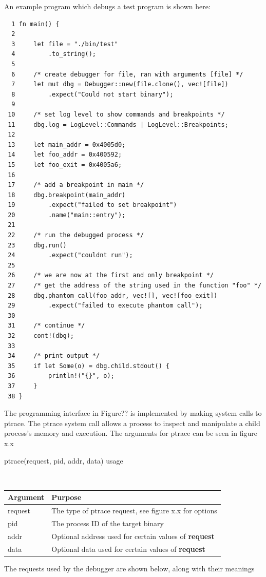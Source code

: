 \documentclass{article}
\begin{document}
An example program which debugs a test program is shown here:
\begin{verbatim}
  1 fn main() {
  2
  3     let file = "./bin/test"
  4         .to_string();
  5
  6     /* create debugger for file, ran with arguments [file] */
  7     let mut dbg = Debugger::new(file.clone(), vec![file])
  8         .expect("Could not start binary");
  9
 10     /* set log level to show commands and breakpoints */
 11     dbg.log = LogLevel::Commands | LogLevel::Breakpoints;
 12
 13     let main_addr = 0x4005d0;
 14     let foo_addr = 0x400592;
 15     let foo_exit = 0x4005a6;
 16
 17     /* add a breakpoint in main */
 18     dbg.breakpoint(main_addr)
 19         .expect("failed to set breakpoint")
 20         .name("main::entry");
 21
 22     /* run the debugged process */
 23     dbg.run()
 24         .expect("couldnt run");
 25
 26     /* we are now at the first and only breakpoint */
 27     /* get the address of the string used in the function "foo" */
 28     dbg.phantom_call(foo_addr, vec![], vec![foo_exit])
 29         .expect("failed to execute phantom call");
 30
 31     /* continue */
 32     cont!(dbg);
 33
 34     /* print output */
 35     if let Some(o) = dbg.child.stdout() {
 36         println!("{}", o);
 37     }
 38 }
\end{verbatim}

The programming interface in Figure?? is implemented by making system calls to ptrace. The ptrace system call allows a
process to inspect and manipulate a child process's memory and execution. The arguments for ptrace can be seen in figure
x.x

\begin{center}
    \caption{ptrace(request, pid, addr, data) usage} \\
    \begin{tabular}{|l|l|}
    \hline
    \bf Argument & \bf Purpose \\ \hline
    request & The type of ptrace request, see figure x.x for options \\ \hline
    pid & The process ID of the target binary \\ \hline
    addr & Optional address used for certain values of \bf{request} \\ \hline
    data & Optional data used for certain values of \bf{request} \\ \hline
    \end{tabular}
\end{center}

The requests used by the debugger are shown below, along with their meanings
\end{document}
